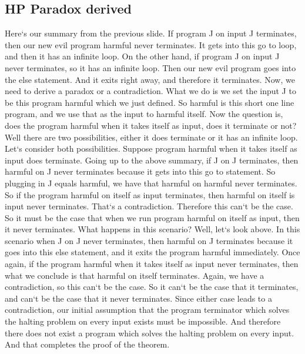 \subsection{HP  Paradox derived}
Here`s our summary from the previous slide.
If program J on input J terminates, then our new evil program harmful never terminates.
It gets into this go to loop, and then it has an infinite loop.
On the other hand, if program J on input J never terminates, so it has an infinite loop.
Then our new evil program goes into the else statement.
And it exits right away, and therefore it terminates.
Now, we need to derive a paradox or a contradiction.
What we do is we set the input J to be this program harmful which we just defined.
So harmful is this short one line program, and we use that as the input to harmful itself.
Now the question is, does the program harmful when it takes itself as input, does it terminate or not? Well there are two possibilities, either it does terminate or it has an infinite loop.
Let`s consider both possibilities.
Suppose program harmful when it takes itself as input does terminate.
Going up to the above summary, if J on J terminates, then harmful on J never terminates because it gets into this go to statement.
So plugging in J equals harmful, we have that harmful on harmful never terminates.
So if the program harmful on itself as input terminates, then harmful on itself is input never terminates.
That`s a contradiction.
Therefore this can`t be the case.
So it must be the case that when we run program harmful on itself as input, then it never terminates.
What happens in this scenario? Well, let`s look above.
In this scenario when J on J never terminates, then harmful on J terminates because it goes into this else statement, and it exits the program harmful immediately.
Once again, if the program harmful when it takes itself as input never terminates, then what we conclude is that harmful on itself terminates.
Again, we have a contradiction, so this can`t be the case.
So it can`t be the case that it terminates, and can`t be the case that it never terminates.
Since either case leads to a contradiction, our initial assumption that the program terminator which solves the halting problem on every input exists must be impossible.
And therefore there does not exist a program which solves the halting problem on every input.
And that completes the proof of the theorem.

